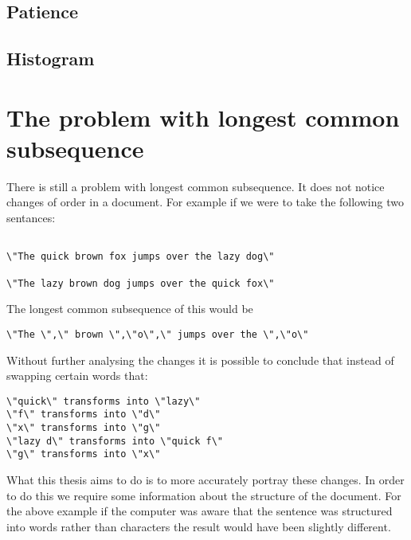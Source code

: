 \subsection{Patience}


\subsection{Histogram}

\section{The problem with longest common subsequence}
There is still a problem with longest common subsequence. It does not notice changes of order in a document.  For example if we were to take the following two sentances:

\begin{verbatim}

\"The quick brown fox jumps over the lazy dog\"

\"The lazy brown dog jumps over the quick fox\"

\end{verbatim}

The longest common subsequence of this would be

\begin{verbatim}
\"The \",\" brown \",\"o\",\" jumps over the \",\"o\"
\end{verbatim}

Without further analysing the changes it is possible to conclude that instead of swapping certain words that:

\begin{verbatim}
\"quick\" transforms into \"lazy\"
\"f\" transforms into \"d\"
\"x\" transforms into \"g\"
\"lazy d\" transforms into \"quick f\"
\"g\" transforms into \"x\"
\end{verbatim}

What this thesis aims to do is to more accurately portray these changes.
In order to do this we require some information about the structure of the document.
For the above example if the computer was aware that the sentence was structured into words rather than characters the result would have been slightly different.

